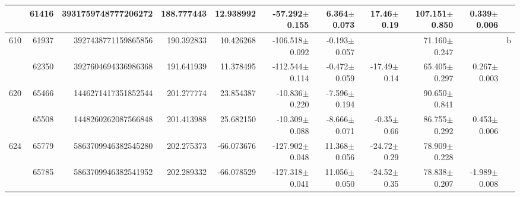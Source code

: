 \documentclass{ws-ijmpd}
\begin{document}
\begin{landscape}
\begin{longtable}{rrrrrrrrrrl}
            &   61416 &      3931759748777206272 &                   188.777443 &                    12.938992 &                -57.292$\pm$0.155 &                  6.364$\pm$0.073 &          17.46$\pm$  0.19 &       107.151$\pm$0.850 &                           0.339$\pm$0.006 &                                                    \\
 \hline 610 &   61937 &      3927438771159865856 &                   190.392833 &                    10.426268 &               -106.518$\pm$0.092 &                 -0.193$\pm$0.057 &                           &        71.160$\pm$0.247 &                                           &                                                  b \\
            &   62350 &      3927604694336986368 &                   191.641939 &                    11.378495 &               -112.544$\pm$0.114 &                 -0.472$\pm$0.059 &         -17.49$\pm$  0.14 &        65.405$\pm$0.297 &                           0.267$\pm$0.003 &                                                    \\
 \hline 620 &   65466 &      1446271417351852544 &                   201.277774 &                    23.854387 &                -10.836$\pm$0.220 &                 -7.596$\pm$0.194 &                           &        90.650$\pm$0.841 &                                           &                                                    \\
            &   65508 &      1448260262087566848 &                   201.413988 &                    25.682150 &                -10.309$\pm$0.088 &                 -8.666$\pm$0.071 &          -0.35$\pm$  0.66 &        86.755$\pm$0.292 &                           0.453$\pm$0.006 &                                                    \\
 \hline 624 &   65779 &      5863709946382545280 &                   202.275373 &                   -66.073676 &               -127.902$\pm$0.048 &                 11.368$\pm$0.056 &         -24.72$\pm$  0.29 &        78.909$\pm$0.228 &                                           &                                                    \\
            &   65785 &      5863709946382541952 &                   202.289332 &                   -66.078529 &               -127.318$\pm$0.041 &                 11.056$\pm$0.050 &         -24.52$\pm$  0.35 &        78.838$\pm$0.207 &                          -1.989$\pm$0.008 &                                                    \\

\end{longtable}
\end{landscape}
\end{document}
